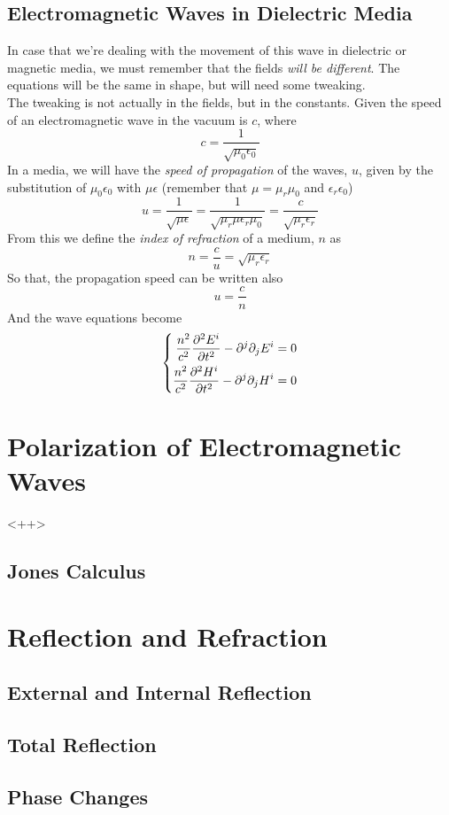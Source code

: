 \documentclass[../electromagnetism.tex]{subfiles}
\begin{document}
\subsection{Electromagnetic Waves in Dielectric Media}
In case that we're dealing with the movement of this wave in dielectric or magnetic media, we must remember that the fields \emph{will be different}. The equations will be the same in shape, but will need some tweaking.\\
The tweaking is not actually in the fields, but in the constants. Given the speed of an electromagnetic wave in the vacuum is $c$, where
\begin{equation*}
	c=\frac{1}{\sqrt{\mu_0\epsilon_0}}
\end{equation*}
In a media, we will have the \textit{speed of propagation} of the waves, $u$, given by the substitution of $\mu_0\epsilon_0$ with $\mu\epsilon$ (remember that $\mu=\mu_r\mu_0$ and $\epsilon_r\epsilon_0$)
\begin{equation}
	u=\frac{1}{\sqrt{\mu\epsilon}}=\frac{1}{\sqrt{\mu_r\mu\epsilon_r\mu_0}}=\frac{c}{\sqrt{\mu_r\epsilon_r}}
	\label{eq:speedofprop}
\end{equation}
From this we define the \textit{index of refraction} of a medium, $n$ as
\begin{equation}
	n=\frac{c}{u}=\sqrt{\mu_r\epsilon_r}
	\label{eq:refractionindex}
\end{equation}
So that, the propagation speed can be written also
\begin{equation*}
	u=\frac{c}{n}
\end{equation*}
And the wave equations become
\begin{equation}
	\left\{ \begin{aligned}
			\frac{n^2}{c^2}\pdv[2]{E^i}{t}-\partial^j\partial_jE^i&= 0\\
			\frac{n^2}{c^2}\pdv[2]{H^i}{t}-\partial^j\partial_jH^i&= 0
	\end{aligned}\right.
	\label{eq:waveequationinmedia}
\end{equation}
\section{Polarization of Electromagnetic Waves}
<++>
\subsection{Jones Calculus}
\section{Reflection and Refraction}
\subsection{External and Internal Reflection}
\subsection{Total Reflection}
\subsection{Phase Changes}
\end{document}
